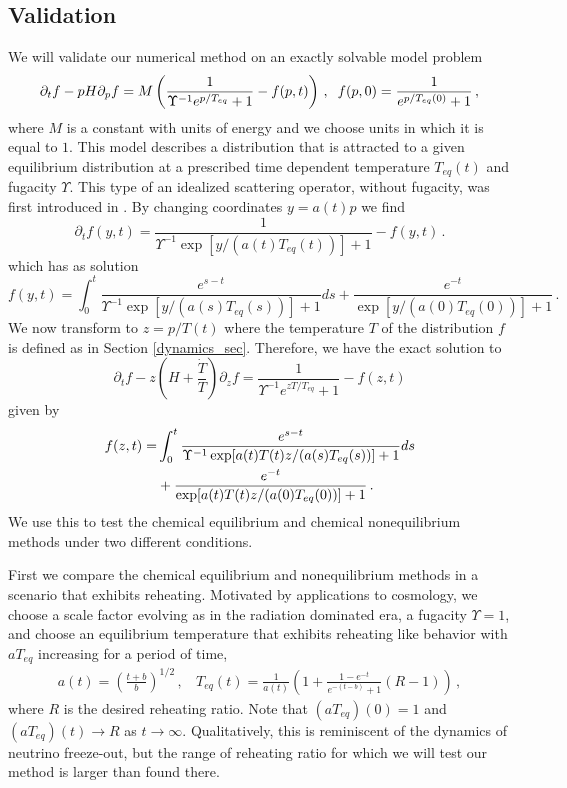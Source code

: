 \subsection{Validation}\label{validation}
We will validate our numerical method on an exactly solvable model problem
\begin{equation}\label{toy_eq}
\partial_t f-pH \partial_p f=M\left(\frac{1}{\Upsilon^{-1}e^{p/T_{eq}}+1}-f(p,t)\right)\,, \hspace{2mm} f(p,0)=\frac{1}{e^{p/T_{eq}(0)}+1}\,,
\end{equation}
where $M$ is a constant with units of energy and we choose units in which it is equal to $1$. This model describes a distribution that is attracted to a given equilibrium distribution at a prescribed time dependent temperature $T_{eq}(t)$ and fugacity $\Upsilon$. This type of an idealized scattering operator, without fugacity, was first introduced in \cite{Anderson:1974nyl}. By changing coordinates $y=a(t)p$ we find
\begin{equation}\label{free_stream_toy}
\partial_tf(y,t)=\frac{1}{\Upsilon^{-1}\exp[y/(a(t)T_{eq}(t))]+1}-f(y,t)\,.
\end{equation}
 which has as solution
\begin{equation}\label{exact_sol}
f(y,t)=\int_0^t\frac{e^{s-t}}{\Upsilon^{-1}\exp[y/(a(s)T_{eq}(s))]+1}ds+\frac{e^{-t}}{\exp[y/(a(0)T_{eq}(0))]+1}\,.
\end{equation}
We now transform to $z=p/T(t)$ where the temperature $T$ of the distribution $f$ is defined as in Section \ref{dynamics_sec}.  Therefore, we have the exact solution to
\begin{equation}\label{k_eq_toy}
\partial_tf-z\left(H+\frac{\dot{T}}{T}\right)\partial_zf=\frac{1}{\Upsilon^{-1}e^{zT/T_{eq}}+1}-f(z,t)
\end{equation}
given by
\begin{align}
f(z,t)=&\int_0^t\frac{e^{s-t}}{\Upsilon^{-1}\exp[a(t)T(t)z/(a(s)T_{eq}(s))]+1}ds\\
&+\frac{e^{-t}}{\exp[a(t)T(t)z/(a(0)T_{eq}(0))]+1}\,.\notag
\end{align}
We use this to test the chemical equilibrium and chemical nonequilibrium methods under two different conditions. 

First we compare the chemical equilibrium and nonequilibrium methods in a scenario that exhibits reheating.  Motivated by applications to cosmology, we choose a scale factor evolving as in the radiation dominated era, a fugacity $\Upsilon=1$, and choose an equilibrium temperature that exhibits reheating like behavior with $aT_{eq}$ increasing for a period of time,
\begin{align}\label{a_T_def}
a(t)=\left(\frac{t+b}{b}\right)^{1/2}\,,\ \  \ \
T_{eq}(t)=\frac{1}{a(t)}\left(1+\frac{1-e^{-t}}{e^{-(t-b)}+1}(R-1)\right)\,,
\end{align}
where $R$ is the desired reheating ratio. Note that $(aT_{eq})(0)=1$ and $(aT_{eq})(t)\rightarrow R$ as $t\rightarrow\infty$. Qualitatively, this is reminiscent of the dynamics of neutrino freeze-out, but the range of reheating ratio for which we will test our method is larger than found there.

